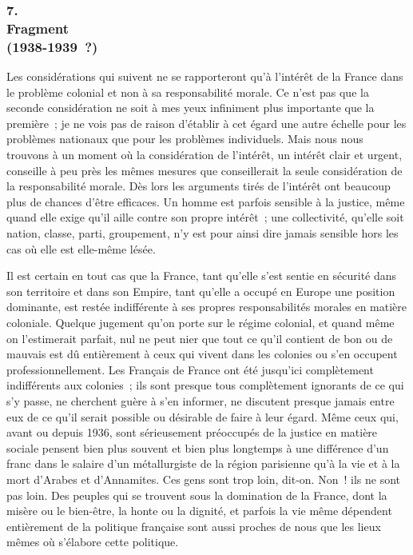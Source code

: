 \documentclass[french,twoside]{book} %
\begin{document}
\subsubsection[7. Fragment, (1938-1939 ?)]{7. \\
Fragment \\
(1938-1939 ?)}
\noindent \par
Les considérations qui suivent ne se rapporteront qu'à l'intérêt de la France dans le problème colonial et non à sa responsabilité morale. Ce n'est pas que la seconde considération ne soit à mes yeux infiniment plus importante que la première ; je ne vois pas de raison d'établir à cet égard une autre échelle pour les problèmes nationaux que pour les problèmes individuels. Mais nous nous trouvons à un moment où la considération de l'intérêt, un intérêt clair et urgent, conseille à peu près les mêmes mesures que conseillerait la seule considération de la responsabilité morale. Dès lors les arguments tirés de l'intérêt ont beaucoup plus de chances d'être efficaces. Un homme est parfois sensible à la justice, même quand elle exige qu'il aille contre son propre intérêt ; une collectivité, qu'elle soit nation, classe, parti, groupement, n'y est pour ainsi dire jamais sensible hors les cas où elle est elle-même lésée.\par
Il est certain en tout cas que la France, tant qu'elle s'est sentie en sécurité dans son territoire et dans son Empire, tant qu'elle a occupé en Europe une position dominante, est restée indifférente à ses propres responsabilités mora­les en matière coloniale. Quelque jugement qu'on porte sur le régime colonial, et quand même on l'estimerait parfait, nul ne peut nier que tout ce qu'il contient de bon ou de mauvais est dû entièrement à ceux qui vivent dans les colonies ou s'en occupent professionnellement. Les Français de France ont été jusqu'ici complètement indifférents aux colonies ; ils sont presque tous complètement ignorants de ce qui s'y passe, ne cherchent guère à s'en infor­mer, ne discutent presque jamais entre eux de ce qu'il serait possible ou désirable de faire à leur égard. Même ceux qui, avant ou depuis 1936, sont sérieusement préoccupés de la justice en matière sociale pensent bien plus souvent et bien plus longtemps à une différence d'un franc dans le salaire d'un métallurgiste de la région parisienne qu'à la vie et à la mort d'Arabes et d'Annamites. Ces gens sont trop loin, dit-on. Non ! ils ne sont pas loin. Des peuples qui se trouvent sous la domination de la France, dont la misère ou le bien-être, la honte ou la dignité, et parfois la vie même dépendent entièrement de la politique française sont aussi proches de nous que les lieux mêmes où s'élabore cette politique.\par
\end{document}
